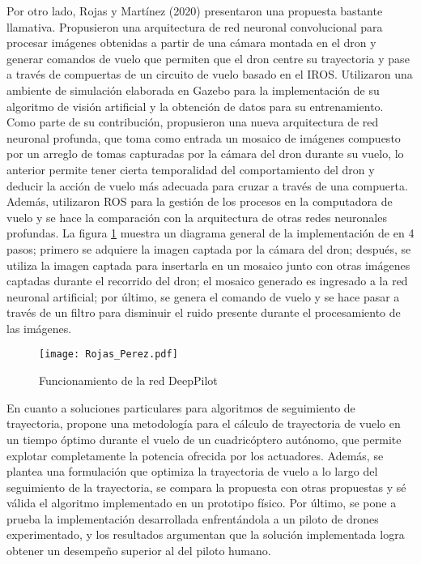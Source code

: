 Por otro lado, Rojas y Martínez (2020)\citet{rojas2020deeppilot} presentaron una propuesta bastante llamativa. Propusieron una arquitectura de red neuronal convolucional para procesar imágenes obtenidas a partir de una cámara montada en el dron y generar comandos de vuelo que permiten que el dron centre su trayectoria y pase a través de compuertas de un circuito de vuelo basado en el IROS. Utilizaron una ambiente de simulación elaborada en Gazebo para la implementación de su algoritmo de visión artificial y la obtención de datos para su entrenamiento. Como parte de su contribución, propusieron una nueva arquitectura de red neuronal profunda, que toma como entrada un mosaico de imágenes compuesto por un arreglo de tomas capturadas por la cámara del dron durante su vuelo, lo anterior permite tener cierta temporalidad del comportamiento del dron y deducir la acción de vuelo más adecuada para cruzar a través de una compuerta.
Además, utilizaron ROS para la gestión de los procesos en la computadora de vuelo y se hace la comparación con la arquitectura de otras redes neuronales profundas. La figura \ref{fig:Rojas_Perez} muestra un diagrama general de la implementación de \citet{rojas2020deeppilot} en 4 pasos; primero se adquiere la imagen captada por la cámara del dron; después, se utiliza la imagen captada para insertarla en un mosaico junto con otras imágenes captadas durante el recorrido del dron; el mosaico generado es ingresado a la red neuronal artificial; por último, se genera el comando de vuelo y se hace pasar a través de un filtro para disminuir el ruido presente durante el procesamiento de las imágenes.

\begin{figure}[ht]
    \centering
    \texttt{[image: Rojas\_Perez.pdf]}
    \caption{Funcionamiento de la red DeepPilot \citet{rojas2020deeppilot}}
    \label{fig:Rojas_Perez}
\end{figure}

En cuanto a soluciones particulares para algoritmos de seguimiento de trayectoria, \citet{foehn2021time} propone una metodología para el cálculo de trayectoria de vuelo en un tiempo óptimo durante el vuelo de un cuadricóptero autónomo, que permite explotar completamente la potencia ofrecida por los actuadores. Además, se plantea una formulación que optimiza la trayectoria de vuelo a lo largo del seguimiento de la trayectoria, se compara la propuesta con otras propuestas y sé válida el algoritmo implementado en un prototipo físico. Por último, se pone a prueba la implementación desarrollada enfrentándola a un piloto de drones experimentado, y los resultados argumentan que la solución implementada logra obtener un desempeño superior al del piloto humano.

